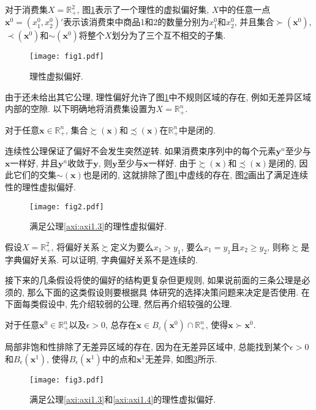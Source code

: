 \documentclass[cn, 12pt, math=mtpro2, bibstyle=apa, blue, twocol]{elegantbook}
\newcommand{\R}{\mathbb{R}}
\newcommand{\x}{\mathbf{x}}
\begin{document}
对于消费集$X=\R_+^2$, 图\ref{fig1.1}表示了一个理性的虚拟偏好集, $X$中的任意一点$\x^0=(x_1^0,x_2^0)'$表示该消费束中商品1和2的数量分别为$x_1^0$和$x_2^0$, 并且集合$\succ(\x^0)$, $\prec(\x^0)$和$\sim(\x^0)$将整个$X$划分为了三个互不相交的子集.
\begin{figure}
  \centering
  \texttt{[image: fig1.pdf]}
  \caption{理性虚拟偏好.}\label{fig1.1}
\end{figure}

由于还未给出其它公理, 理性偏好允许了图\ref{fig1.1}中不规则区域的存在, 例如无差异区域内部的空隙. 以下明确地将消费集设置为$X=\R^n_+$.

\begin{axiom}[连续性]\label{axi:axi1.3}
对于任意$\x\in\R^n_+$, 集合$\succsim(\x)$和$\precsim(\x)$在$\R_+^n$中是闭的.
\end{axiom}
连续性公理保证了偏好不会发生突然逆转. 如果消费束序列中的每个元素$\mathbf{y}^n$至少与$\x$一样好, 并且$\mathbf{y}^n$收敛于$\mathbf{y}$, 则$\mathbf{y}$至少与$\x$一样好. 由于$\succsim(\x)$和$\precsim(\x)$是闭的, 因此它们的交集$\sim(\x)$也是闭的, 这就排除了图\ref{fig1.1}中虚线的存在, 图\ref{fig1.2}画出了满足连续性的理性虚拟偏好.

\begin{figure}[htbp!]
  \centering
  \texttt{[image: fig2.pdf]}
  \caption{满足公理\ref{axi:axi1.3}的理性虚拟偏好.}\label{fig1.2}
\end{figure}

\begin{example}[字典偏好关系]
假设$X=\R_+^2$, 将偏好关系$\succsim$定义为要么$x_1>y_1$, 要么$x_1=y_1$且$x_2\ge y_2$, 则称$\succsim$是字典偏好关系. 可以证明, 字典偏好关系不是连续的.
\end{example}

接下来的几条假设将使的偏好的结构更复杂但更规则, 如果说前面的三条公理是必须的, 那么下面的这类假设则要根据具 体研究的选择决策问题来决定是否使用. 在下面每类假设中, 先介绍较弱的公理, 然后再介绍较强的公理.

\begin{axiom}[局部非饱和性]\label{axi:axi1.4}
对于任意$\x^0\in\R^n_+$以及$\epsilon>0$, 总存在$\x\in B_\varepsilon(\x^0)\cap \R_+^n$, 使得$\x\succ\x^0$.
\end{axiom}
局部非饱和性排除了无差异区域的存在, 因为在无差异区域中, 总能找到某个$\epsilon>0$和$B_\epsilon(\x^1)$, 使得$B_\epsilon(\x^1)$中的点和$\x^1$无差异, 如图\ref{fig1.3}所示.
\begin{figure}
  \centering
  \texttt{[image: fig3.pdf]}
  \caption{满足公理\ref{axi:axi1.3}和\ref{axi:axi1.4}的理性虚拟偏好.}\label{fig1.3}
\end{figure}
\end{document}
